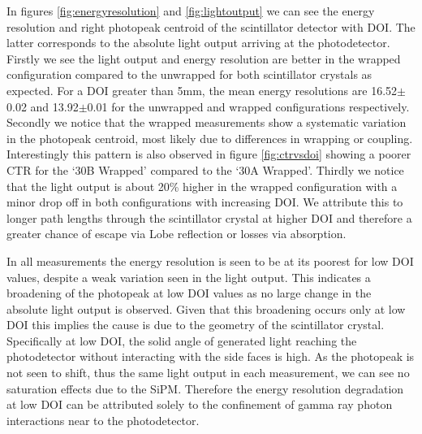 In figures \ref{fig:energyresolution} and \ref{fig:lightoutput} we can see the energy resolution and right photopeak centroid of the scintillator detector with DOI. The latter corresponds to the absolute light output arriving at the photodetector. Firstly we see the light output and energy resolution are better in the wrapped configuration compared to the unwrapped for both scintillator crystals as expected. For a DOI greater than 5mm, the mean energy resolutions are 16.52$\pm$0.02 and 13.92$\pm$0.01 for the unwrapped and wrapped configurations respectively. Secondly we notice that the wrapped measurements show a systematic variation in the photopeak centroid, most likely due to differences in wrapping or coupling. Interestingly this pattern is also observed in figure \ref{fig:ctrvsdoi} showing a poorer CTR for the `30B Wrapped' compared to the `30A Wrapped'. Thirdly we notice that the light output is about 20\% higher in the wrapped configuration with a minor drop off in both configurations with increasing DOI. We attribute this to longer path lengths through the scintillator crystal at higher DOI and therefore a greater chance of escape via Lobe reflection\cite{Janecek_Moses_2010} or losses via absorption.

In all measurements the energy resolution is seen to be at its poorest for low DOI values, despite a weak variation seen in the light output. This indicates a broadening of the photopeak at low DOI values as no large change in the absolute light output is observed. Given that this broadening occurs only at low DOI this implies the cause is due to the geometry of the scintillator crystal. Specifically at low DOI, the solid angle of generated light reaching the photodetector without interacting with the side faces is high. As the photopeak is not seen to shift, thus the same light output in each measurement, we can see no saturation effects due to the SiPM. Therefore
the energy resolution degradation at low DOI can be attributed solely to the confinement of gamma ray photon interactions near to the photodetector.